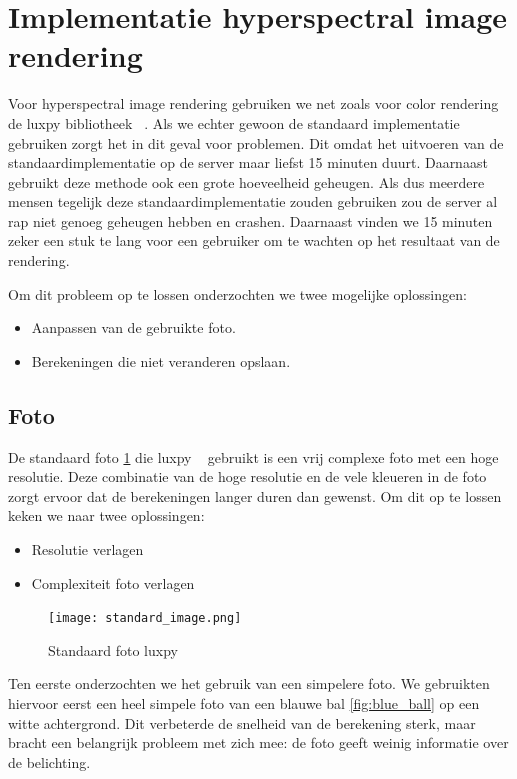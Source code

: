 \section{Implementatie hyperspectral image rendering}

Voor hyperspectral image rendering gebruiken we net zoals voor color rendering de luxpy bibliotheek ~\cite{smetTutorialLuxPyPython2020}. Als we echter gewoon de standaard implementatie gebruiken zorgt het in dit geval voor problemen. Dit omdat het uitvoeren van de standaardimplementatie op de server maar liefst 15 minuten duurt. Daarnaast gebruikt deze methode ook een grote hoeveelheid geheugen. Als dus
meerdere mensen tegelijk deze standaardimplementatie zouden gebruiken zou de server al rap niet genoeg geheugen hebben en crashen. Daarnaast vinden we 15 minuten zeker een stuk te lang voor een gebruiker om te wachten op het resultaat van de rendering. 

Om dit probleem op te lossen onderzochten we twee mogelijke oplossingen:
\begin{itemize}
    \item Aanpassen van de gebruikte foto.
    \item Berekeningen die niet veranderen opslaan.
\end{itemize} 

\subsection{Foto}

De standaard foto \ref{fig:std_img_luxpy} die luxpy ~\cite{smetTutorialLuxPyPython2020} gebruikt is een vrij complexe foto met een hoge
resolutie. Deze combinatie van de hoge resolutie en de vele kleueren in de foto
zorgt ervoor dat de berekeningen langer duren dan gewenst. Om dit op te lossen keken we naar twee oplossingen:

\begin{itemize}
    \item Resolutie verlagen
    \item Complexiteit foto verlagen
\end{itemize}

\begin{figure}[H]
    \centering
    \texttt{[image: standard\_image.png]}
    \caption{Standaard foto luxpy ~\cite{smetTutorialLuxPyPython2020}}%
    \label{fig:std_img_luxpy}
\end{figure}

Ten eerste onderzochten we het gebruik van een simpelere foto. We gebruikten hiervoor eerst een heel simpele foto van een blauwe bal \ref{fig:blue_ball} op een witte achtergrond. Dit verbeterde de snelheid van de berekening sterk, maar bracht een belangrijk probleem met zich mee: de foto geeft weinig informatie over de belichting.

